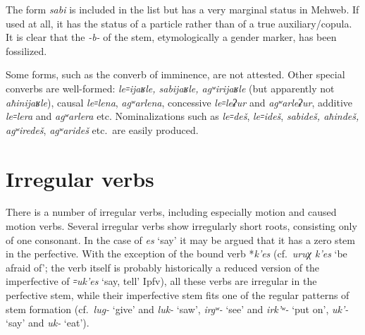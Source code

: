 \documentclass[output=paper]{langsci/langscibook}
\begin{document}
The form \emph{sabi} is included in the list but has a very marginal
status in Mehweb. If used at all, it has the status of a particle rather
than of a true auxiliary/copula. It is clear that the \emph{-b-} of the
stem, etymologically a gender marker, has been fossilized.

Some forms, such as the converb of imminence, are not attested. Other
special converbs are well-formed: \emph{le꞊ijaʁle, sabijaʁle,
agʷirijaʁle} (but apparently not \emph{aħinijaʁle}), causal
\emph{le꞊lena}, \emph{agʷarlena}, concessive \emph{le꞊leʡur} and
\emph{agʷarleʡur}, additive \emph{le꞊lera} and \emph{agʷarlera} etc.
Nominalizations such as \emph{le꞊deš}, \emph{le꞊ideš}, \emph{sabideš,
aħindeš,} \emph{agʷiredeš}, \emph{agʷarideš} etc.\ are easily produced.
%


\section{Irregular verbs}\label{irregular-verbs}


There is a number of irregular verbs, including especially motion and
caused motion verbs. Several irregular verbs show irregularly short
roots, consisting only of one consonant. In the case of \emph{es} `say'
it may be argued that it has a zero stem in the perfective. With the
exception of the bound verb *\emph{k'es} (cf.\ \emph{uruχ k'es} `be
afraid of'; the verb itself is probably historically a reduced version
of the imperfective of \emph{꞊uk'es} `say, tell' Ipfv), all
these verbs are irregular in the perfective stem, while their
imperfective stem fits one of the regular patterns of stem formation
(cf.\ \emph{lug-} `give' and \emph{luk-} `saw', \emph{irgʷ-} `see' and
\emph{irk'ʷ-} `put on', \emph{uk'-} `say' and \emph{uk-} `eat').
{\par}
\end{document}
